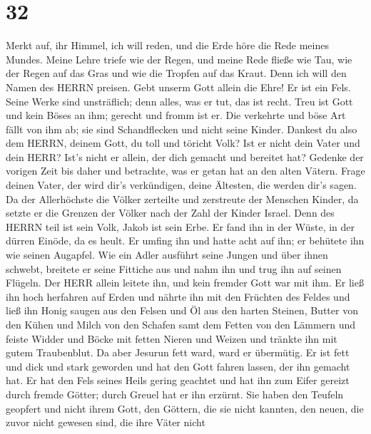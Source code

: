 \hypertarget{section-31}{%
\section{32}\label{section-31}}

 Merkt auf, ihr Himmel, ich will reden, und die Erde höre
die Rede meines Mundes.  Meine Lehre triefe wie der Regen,
und meine Rede fließe wie Tau, wie der Regen auf das Gras und wie die
Tropfen auf das Kraut.  Denn ich will den Namen des HERRN
preisen. Gebt unserm Gott allein die Ehre!  Er ist ein Fels.
Seine Werke sind unsträflich; denn alles, was er tut, das ist recht.
Treu ist Gott und kein Böses an ihm; gerecht und fromm ist er.
 Die verkehrte und böse Art fällt von ihm ab; sie sind
Schandflecken und nicht seine Kinder.  Dankest du also dem
HERRN, deinem Gott, du toll und töricht Volk? Ist er nicht dein Vater
und dein HERR? Ist's nicht er allein, der dich gemacht und bereitet hat?
 Gedenke der vorigen Zeit bis daher und betrachte, was er
getan hat an den alten Vätern. Frage deinen Vater, der wird dir's
verkündigen, deine Ältesten, die werden dir's sagen.  Da der
Allerhöchste die Völker zerteilte und zerstreute der Menschen Kinder, da
setzte er die Grenzen der Völker nach der Zahl der Kinder Israel.
 Denn des HERRN teil ist sein Volk, Jakob ist sein Erbe.
 Er fand ihn in der Wüste, in der dürren Einöde, da es
heult. Er umfing ihn und hatte acht auf ihn; er behütete ihn wie seinen
Augapfel.  Wie ein Adler ausführt seine Jungen und über
ihnen schwebt, breitete er seine Fittiche aus und nahm ihn und trug ihn
auf seinen Flügeln.  Der HERR allein leitete ihn, und kein
fremder Gott war mit ihm.  Er ließ ihn hoch herfahren auf
Erden und nährte ihn mit den Früchten des Feldes und ließ ihn Honig
saugen aus den Felsen und Öl aus den harten Steinen, 
Butter von den Kühen und Milch von den Schafen samt dem Fetten von den
Lämmern und feiste Widder und Böcke mit fetten Nieren und Weizen und
tränkte ihn mit gutem Traubenblut.  Da aber Jesurun fett
ward, ward er übermütig. Er ist fett und dick und stark geworden und hat
den Gott fahren lassen, der ihn gemacht hat. Er hat den Fels seines
Heils gering geachtet  und hat ihn zum Eifer gereizt durch
fremde Götter; durch Greuel hat er ihn erzürnt.  Sie haben
den Teufeln geopfert und nicht ihrem Gott, den Göttern, die sie nicht
kannten, den neuen, die zuvor nicht gewesen sind, die ihre Väter nicht
